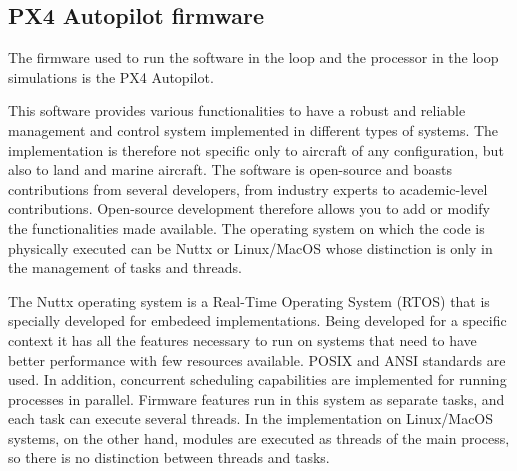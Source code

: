 \begin{en}
	\chapter{PX4 Autopilot firmware}
	The firmware used to run the software in the loop and the processor in the loop simulations is the PX4 Autopilot.
	
	This software provides various functionalities to have a robust and reliable management and control system implemented in different types of systems. The implementation is therefore not specific only to aircraft of any configuration, but also to land and marine aircraft. The software is open-source and boasts contributions from several developers, from industry experts to academic-level contributions. Open-source development therefore allows you to add or modify the functionalities made available. The operating system on which the code is physically executed can be Nuttx or Linux/MacOS whose distinction is only in the management of tasks and threads.
	
	The Nuttx operating system is a Real-Time Operating System (RTOS) that is specially developed for embedeed implementations. Being developed for a specific context it has all the features necessary to run on systems that need to have better performance with few resources available. POSIX and ANSI standards are used. In addition, concurrent scheduling capabilities are implemented for running processes in parallel. Firmware features run in this system as separate tasks, and each task can execute several threads.
	In the implementation on Linux/MacOS systems, on the other hand, modules are executed as threads of the main process, so there is no distinction between threads and tasks.
\end{en}

